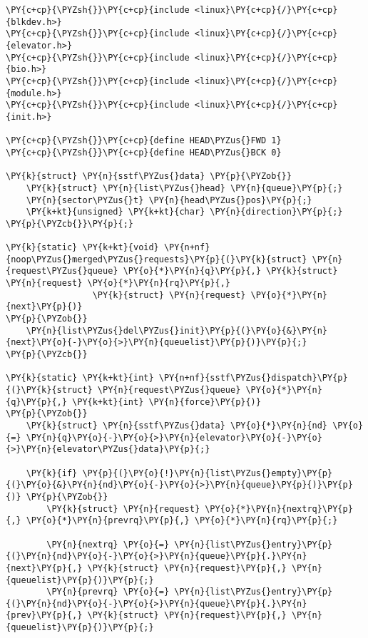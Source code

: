 \begin{Verbatim}[commandchars=\\\{\}]
\PY{c+cp}{\PYZsh{}}\PY{c+cp}{include <linux}\PY{c+cp}{/}\PY{c+cp}{blkdev.h>}
\PY{c+cp}{\PYZsh{}}\PY{c+cp}{include <linux}\PY{c+cp}{/}\PY{c+cp}{elevator.h>}
\PY{c+cp}{\PYZsh{}}\PY{c+cp}{include <linux}\PY{c+cp}{/}\PY{c+cp}{bio.h>}
\PY{c+cp}{\PYZsh{}}\PY{c+cp}{include <linux}\PY{c+cp}{/}\PY{c+cp}{module.h>}
\PY{c+cp}{\PYZsh{}}\PY{c+cp}{include <linux}\PY{c+cp}{/}\PY{c+cp}{init.h>}

\PY{c+cp}{\PYZsh{}}\PY{c+cp}{define HEAD\PYZus{}FWD 1}
\PY{c+cp}{\PYZsh{}}\PY{c+cp}{define HEAD\PYZus{}BCK 0}

\PY{k}{struct} \PY{n}{sstf\PYZus{}data} \PY{p}{\PYZob{}}
	\PY{k}{struct} \PY{n}{list\PYZus{}head} \PY{n}{queue}\PY{p}{;}
	\PY{n}{sector\PYZus{}t} \PY{n}{head\PYZus{}pos}\PY{p}{;}
	\PY{k+kt}{unsigned} \PY{k+kt}{char} \PY{n}{direction}\PY{p}{;}
\PY{p}{\PYZcb{}}\PY{p}{;}

\PY{k}{static} \PY{k+kt}{void} \PY{n+nf}{noop\PYZus{}merged\PYZus{}requests}\PY{p}{(}\PY{k}{struct} \PY{n}{request\PYZus{}queue} \PY{o}{*}\PY{n}{q}\PY{p}{,} \PY{k}{struct} \PY{n}{request} \PY{o}{*}\PY{n}{rq}\PY{p}{,}
				 \PY{k}{struct} \PY{n}{request} \PY{o}{*}\PY{n}{next}\PY{p}{)}
\PY{p}{\PYZob{}}
	\PY{n}{list\PYZus{}del\PYZus{}init}\PY{p}{(}\PY{o}{&}\PY{n}{next}\PY{o}{-}\PY{o}{>}\PY{n}{queuelist}\PY{p}{)}\PY{p}{;}
\PY{p}{\PYZcb{}}

\PY{k}{static} \PY{k+kt}{int} \PY{n+nf}{sstf\PYZus{}dispatch}\PY{p}{(}\PY{k}{struct} \PY{n}{request\PYZus{}queue} \PY{o}{*}\PY{n}{q}\PY{p}{,} \PY{k+kt}{int} \PY{n}{force}\PY{p}{)}
\PY{p}{\PYZob{}}
	\PY{k}{struct} \PY{n}{sstf\PYZus{}data} \PY{o}{*}\PY{n}{nd} \PY{o}{=} \PY{n}{q}\PY{o}{-}\PY{o}{>}\PY{n}{elevator}\PY{o}{-}\PY{o}{>}\PY{n}{elevator\PYZus{}data}\PY{p}{;}
     
	\PY{k}{if} \PY{p}{(}\PY{o}{!}\PY{n}{list\PYZus{}empty}\PY{p}{(}\PY{o}{&}\PY{n}{nd}\PY{o}{-}\PY{o}{>}\PY{n}{queue}\PY{p}{)}\PY{p}{)} \PY{p}{\PYZob{}}
		\PY{k}{struct} \PY{n}{request} \PY{o}{*}\PY{n}{nextrq}\PY{p}{,} \PY{o}{*}\PY{n}{prevrq}\PY{p}{,} \PY{o}{*}\PY{n}{rq}\PY{p}{;}  

		\PY{n}{nextrq} \PY{o}{=} \PY{n}{list\PYZus{}entry}\PY{p}{(}\PY{n}{nd}\PY{o}{-}\PY{o}{>}\PY{n}{queue}\PY{p}{.}\PY{n}{next}\PY{p}{,} \PY{k}{struct} \PY{n}{request}\PY{p}{,} \PY{n}{queuelist}\PY{p}{)}\PY{p}{;}
		\PY{n}{prevrq} \PY{o}{=} \PY{n}{list\PYZus{}entry}\PY{p}{(}\PY{n}{nd}\PY{o}{-}\PY{o}{>}\PY{n}{queue}\PY{p}{.}\PY{n}{prev}\PY{p}{,} \PY{k}{struct} \PY{n}{request}\PY{p}{,} \PY{n}{queuelist}\PY{p}{)}\PY{p}{;}


\end{Verbatim}
